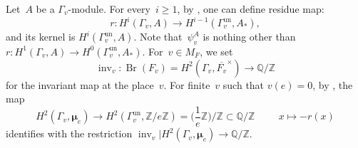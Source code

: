 \documentclass[a4paper,english,12pt]{amsart}
\newcommand{\QQ}{\mathbb{Q}}
\newcommand{\GG}{ G}
\newcommand{\ZZ}{\mathbb{Z}}
\newcommand{\Fv}{F_v}
\newcommand{\vMF}{v\in M_F}
\newcommand{\muu}{\boldsymbol{\mu}}
\DeclareMathOperator{\un}{un}
\DeclareMathOperator{\inv}{inv}
\DeclareMathOperator{\Br}{Br}
\numberwithin{equation}{subsection}
\begin{document}
\subsubsection{}Let~$A$ be a $\Gamma_v$-module. For every~$i\geq 1$, by \cite[Definition 1.4.3]{brauergrothendieck}, one can define residue map: $$r:H^i(\Gamma_v, A)\to H^{i-1}(\Gamma_v^{\un}, A_*),$$  and its kernel is $H^i(\Gamma_v^{\un}, A)$. Note that~$\psi_v^{A}$ is nothing other than $r:H^1(\Gamma_v, A)\to H^0(\Gamma_v^{\un}, A_*)$. For~$\vMF$, we set $$ \inv_v:\Br(F_v)=H^2(\Gamma_v, \overline{\Fv}^{\times})\to \QQ/\ZZ$$ for the invariant map at the place~$v$. For finite~$v$ such that $v(e)=0$, by \cite[Theorem 1.4.14]{brauergrothendieck}, the map $$H^2(\Gamma_v,\muu_e)\to H^2(\Gamma_v^{\un}, \ZZ/e\ZZ)=\bigg(\frac{1}{e}\ZZ\bigg)/\ZZ\subset\QQ/\ZZ\hspace{1cm}x\mapsto -r(x)$$ identifies with the restriction $\inv_v|H^2(\Gamma_v,\muu_e)\to\QQ/\ZZ$. %
\end{document}

